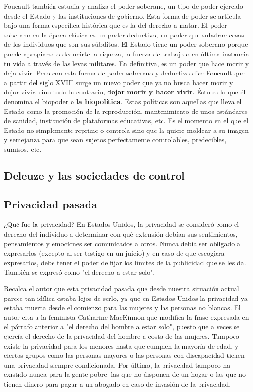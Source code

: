 \documentclass[11pt]{article}
\begin{document}
Foucault también estudia y analiza el poder soberano, un tipo de poder ejercido desde el Estado y las instituciones de gobierno. Esta forma de poder se articula bajo una forma específica histórica que es la del derecho a matar. El poder soberano en la época clásica es un poder deductivo, un poder que substrae cosas de los individuos que son sus súbditos. El Estado tiene un poder soberano porque puede apropiarse o deducirte la riqueza, la fuerza de trabajo o en última instancia tu vida a través de las levas militares. En definitiva, es un poder que hace morir y deja vivir. Pero con esta forma de poder soberano y deductivo dice Foucault que a partir del siglo XVIII surge un nuevo poder que ya no busca hacer morir y dejar vivir, sino todo lo contrario, \textbf{dejar morir y hacer vivir}. Ésto es lo que él denomina el biopoder o \textbf{la biopolítica}. Estas políticas son aquellas que lleva el Estado como la promoción de la reproducción, mantenimiento de unos estándares de sanidad, institución de plataformas educativas, etc. Es el momento en el que el Estado no simplemente reprime o controla sino que la quiere moldear a su imagen y semejanza para que sean sujetos perfectamente controlables, predecibles, sumisos, etc.
\subsection{Deleuze y las sociedades de control}
\subsection{Privacidad pasada}
¿Qué fue la privacidad? En Estados Unidos, la privacidad se consideró como el derecho del individuo a determinar con qué extensión debían sus sentimientos, pensamientos y emociones ser comunicados a otros. Nunca debía ser obligado a expresarlos (excepto al ser testigo en un juicio) y en caso de que escogiera expresarlos, debe tener el poder de fijar los límites de la publicidad que se les da. También se expresó como "el derecho a estar solo".

Recalca el autor que esta privacidad pasada que desde nuestra situación actual parece tan idílica estaba lejos de serlo, ya que en Estados Unidos la privacidad ya estaba muerta desde el comienzo para las mujeres y las personas no blancas. El autor cita a la feminista Catharine MacKinnon que modifica la frase expresada en el párrafo anterior a "el derecho del hombre a estar solo", puesto que a veces se ejercía el derecho de la privacidad del hombre a costa de las mujeres. Tampoco existe la privacidad para los menores hasta que cumplen la mayoría de edad, y ciertos grupos como las personas mayores o las personas con discapacidad tienen una privacidad siempre condicionada. Por último, la privacidad tampoco ha existido nunca para la gente pobre, las que no disponen de un hogar o las que no tienen dinero para pagar a un abogado en caso de invasión de la privacidad.
\end{document}
